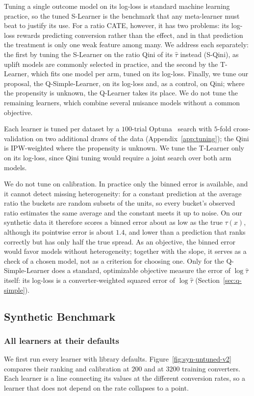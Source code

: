 \documentclass{article}
\begin{document}
Tuning a single outcome model on its log-loss is standard machine learning
practice, so the tuned S-Learner is the benchmark that any meta-learner must
beat to justify its use. For a ratio CATE, however, it has two problems: its
log-loss rewards predicting conversion rather than the effect, and in that
prediction the treatment is only one weak feature among many. We address each
separately: the first by tuning the S-Learner on the ratio Qini of its
$\hat\tau$ instead (S-Qini), as uplift models are commonly selected in
practice, and the second by the T-Learner, which fits one model per arm, tuned
on its log-loss. Finally, we tune our proposal, the Q-Simple-Learner, on its
log-loss and, as a control, on Qini; where the propensity is unknown, the
Q-Learner takes its place. We do not tune the remaining learners, which
combine several nuisance models without a common objective.

Each learner is tuned per dataset by a $100$-trial Optuna~\citep{optuna2019}
search with $5$-fold cross-validation on two additional draws of the data
(Appendix~\ref{app:tuning}); the Qini is IPW-weighted where the propensity is
unknown. We tune the T-Learner only on its log-loss, since Qini tuning would
require a joint search over both arm models.

We do not tune on calibration. In practice only the binned error is available, and
it cannot detect missing heterogeneity: for a constant prediction at the
average ratio the buckets are random subsets of the units, so every bucket's
observed ratio estimates the same average and the constant meets it up to
noise. On our synthetic data it therefore scores a binned error about as low
as the true $\tau(x)$, although its pointwise error is about $1.4$, and lower than
a prediction that ranks correctly but has only half the true spread. As an
objective, the binned error would favor models without heterogeneity;
together with the slope, it serves as a check of a chosen model, not as a
criterion for choosing one. Only for the Q-Simple-Learner does a standard,
optimizable objective measure the error of $\log\hat\tau$ itself: its
log-loss is a converter-weighted squared error of $\log\hat\tau$
(Section~\ref{sec:q-simple}).

\subsection{Synthetic Benchmark}
\label{sec:syn-v2}

\subsubsection{All learners at their defaults}
\label{sec:syn-untuned-v2}
We first run every learner with library defaults.
Figure~\ref{fig:syn-untuned-v2} compares their ranking and calibration at
$200$ and at $3200$ training converters. Each learner is a line connecting
its values at the different conversion rates, so a learner that does not
depend on the rate collapses to a point.
\end{document}
